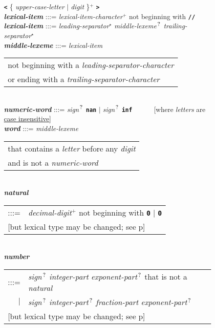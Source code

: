 \documentclass[12pt]{article}
\newcommand{\TT}[1]{{\tt \bfseries #1}}
\newcommand{\STAR}{{\Large $^\star$}}
\newcommand{\PLUS}[1][]{{$^{+#1}$}}
\newcommand{\QMARK}{{$^{\,\mbox{\footnotesize ?}}$}}
\newcommand{\ttkey}[1]{{\tt \bfseries #1}}
\newcommand{\emkey}[1]{{\em \bfseries #1}}
\newcommand{\pagref}[1]{p\pageref{#1}}
\newlength{\figurewidth}
\newenvironment{boxedfigure}[1][!btp]%
	{\begin{figure*}[#1]
	 \begin{lrbox}{\figurebox}
	 \begin{minipage}{\figurewidth}

	 \vspace*{1ex}}%
	{
	 \vspace*{1ex}

	 \end{minipage}
	 \end{lrbox}

	 \centering
	 \fbox{\hspace*{0.1in}\usebox{\figurebox}\hspace*{0.1in}}
	 \end{figure*}}
\begin{document}
\begin{boxedfigure}[!p]
    \TT{<} \{ {\em upper-case-letter} $|$ {\em digit} \}\PLUS{} \TT{>}
\\[1ex]
\emkey{lexical-item} :::= {\em lexical-item-character}\PLUS{}
                       not beginning with \TT{//}
\\[0.5ex]
\emkey{lexical-item} :::= {\em leading-separator}\STAR{}
			  {\em middle-lexeme}\QMARK{}
                          {\em trailing-separator}\STAR{}
\\[0.5ex]
\emkey{middle-lexeme} :::=
	{\em lexical-item}
	\begin{tabular}[t]{@{}l@{}}
	not beginning with a {\em leading-separator-character} \\
	or ending with a {\em trailing-separator-character} \\
	\end{tabular}
\\[0.5ex]
\emkey{numeric-word} :::= {\em sign}\QMARK{} \ttkey{nan}
                      $|$ {\em sign}\QMARK{} \ttkey{inf}
		      ~~~~~
		      [where {\em letters} are \underline{case insensitive}]
\\[0.5ex]
\emkey{word} :::= {\em middle-lexeme}
                  \begin{tabular}[t]{@{}l@{}}
		  that contains a {\em letter} before any {\em digit} \\
		  and is not a {\em numeric-word}
		  \end{tabular}
\\[0.5ex]
\emkey{natural}\label{NATURAL}
	\begin{tabular}[t]{@{}rl@{}}
	:::= & {\em decimal-digit}\PLUS{} not beginning with \TT{0} $|$
	       \TT{0} \\
	\multicolumn{2}{l}{[but lexical type may be changed;
	                    see \pagref{LEXEME-TYPE-CONVERSION}]} \\
	\end{tabular}
\\[0.5ex]
\emkey{number}\label{NUMBER}
	\begin{tabular}[t]{@{}rl@{}}
	:::= & {\em sign}\QMARK{} {\em integer-part}
	                          {\em exponent-part}\QMARK{}
	     that is not a {\em natural} \\
	 $|$ & {\em sign}\QMARK{} {\em integer-part}\QMARK{}
	                          {\em fraction-part}
				  {\em exponent-part}\QMARK{} \\
	\multicolumn{2}{l}{[but lexical type may be changed;
	                    see \pagref{LEXEME-TYPE-CONVERSION}]} \\
	\end{tabular}

\end{boxedfigure}
\end{document}
